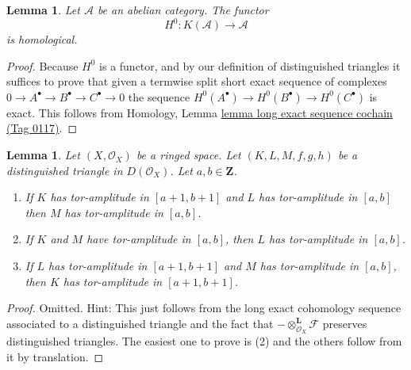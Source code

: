 \documentclass{amsart}
\theoremstyle{plain}
\newtheorem{lemma}[subsection]{Lemma}
\theoremstyle{definition}
\theoremstyle{remark}
\numberwithin{equation}{subsection}
\begin{document}
\begin{lemma}
\label{derived-lemma-cohomology-homological}
Let $\mathcal{A}$ be an abelian category. The functor
$$
H^0 : K(\mathcal{A}) \longrightarrow \mathcal{A}
$$
is homological.
\end{lemma}

\begin{proof}
Because $H^0$ is a functor, and by our definition of distinguished triangles
it suffices to prove that given a termwise split short exact sequence
of complexes $0 \to A^\bullet \to B^\bullet \to C^\bullet \to 0$
the sequence $H^0(A^\bullet) \to H^0(B^\bullet) \to H^0(C^\bullet)$
is exact. This follows from
Homology, Lemma \href{https://stacks.math.columbia.edu/tag/0117}{lemma long exact sequence cochain (Tag 0117)}.
\end{proof}


\begin{lemma}
\label{cohomology-lemma-cone-tor-amplitude}
Let $(X, \mathcal{O}_X)$ be a ringed space.
Let $(K, L, M, f, g, h)$ be a distinguished
triangle in $D(\mathcal{O}_X)$. Let $a, b \in \mathbf{Z}$.
\begin{enumerate}
\item If $K$ has tor-amplitude in $[a + 1, b + 1]$ and
$L$ has tor-amplitude in $[a, b]$ then $M$ has
tor-amplitude in $[a, b]$.
\item If $K$ and $M$ have tor-amplitude in $[a, b]$, then
$L$ has tor-amplitude in $[a, b]$.
\item If $L$ has tor-amplitude in $[a + 1, b + 1]$
and $M$ has tor-amplitude in $[a, b]$, then
$K$ has tor-amplitude in $[a + 1, b + 1]$.
\end{enumerate}
\end{lemma}

\begin{proof}
Omitted. Hint: This just follows from the long exact cohomology sequence
associated to a distinguished triangle and the fact that
$- \otimes_{\mathcal{O}_X}^{\mathbf{L}} \mathcal{F}$
preserves distinguished triangles.
The easiest one to prove is (2) and the others follow from it by
translation.
\end{proof}
\end{document}
